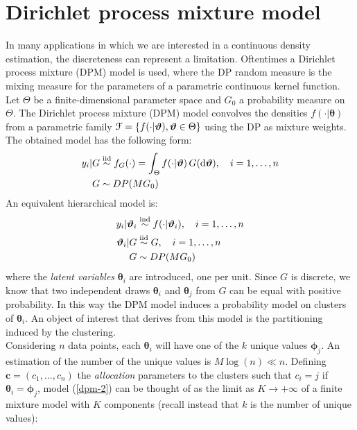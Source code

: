 \section{Dirichlet process mixture model}
In many applications in which we are interested in a continuous density estimation, the discreteness can represent a limitation.
Oftentimes a Dirichlet process mixture (DPM) model is used, where the DP random measure is the mixing measure for the parameters of a parametric continuous kernel function.
Let $\Theta$ be a finite-dimensional parameter space and $G_0$ a probability measure on $\Theta$.
The Dirichlet process mixture (DPM) model convolves the densities $f(\cdot|\boldsymbol\theta)$ from a parametric family $\mathcal F = \{f(\cdot|\boldsymbol{\vartheta}), \boldsymbol{\vartheta} \in \Theta \}$ using the DP as mixture weights.
The obtained model has the following form:
\begin{equation}
	\begin{aligned}\label{dpm-1}
	y_i | G &\stackrel{\text{iid}}{\sim} f_G(\cdot) = \int_\Theta f(\cdot|\boldsymbol{\vartheta}) \, G(\mathrm d\boldsymbol{\vartheta}), \quad i=1,\dots,n \\
	G &\sim DP(M G_0)
	\end{aligned}
\end{equation}
An equivalent hierarchical model is:
\begin{equation}
	\begin{aligned}\label{dpm-2}
	y_i | \boldsymbol{\vartheta}_i &\stackrel{\text{ind}}{\sim} f(\cdot|\boldsymbol{\vartheta}_i), \quad i=1,\dots,n \\
	\boldsymbol{\vartheta}_i | G &\stackrel{\text{iid}}{\sim} G, \quad i=1,\dots,n \\ 
	G &\sim DP(M G_0)
	\end{aligned}
\end{equation}
where the \emph{latent variables} $\boldsymbol\theta_i$ are introduced, one per unit.
Since $G$ is discrete, we know that two independent draws $\boldsymbol\theta_i$ and $\boldsymbol\theta_j$ from $G$ can be equal with positive probability.
In this way the DPM model induces a probability model on clusters of $\boldsymbol\theta_i$.
An object of interest that derives from this model is the partitioning induced by the clustering. \\%
Considering $n$ data points, each $\boldsymbol\theta_i$ will have one of the $k$ unique values $\boldsymbol\phi_{j}$.
An estimation of the number of the unique values is $M\log(n) \ll n$.
Defining  $\boldsymbol c= (c_1,\dots,c_n)$ the \emph{allocation} parameters to the clusters such that $c_i = j$ if $\boldsymbol\theta_i = \boldsymbol\phi_j$, model (\ref{dpm-2}) can be thought of as the limit as $K \to +\infty$  of a finite mixture model with $K$ components (recall instead that $k$ is the number of unique values):
